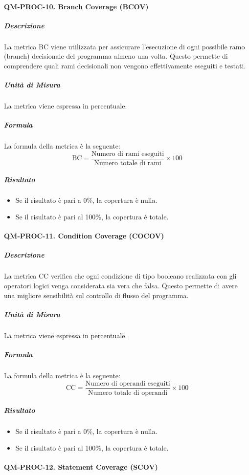 		\paragraph{QM-PROC-10. Branch Coverage (BCOV)}

			\subparagraph{Descrizione}
			La metrica BC viene utilizzata per assicurare l'esecuzione di ogni possibile ramo (branch) decisionale del programma almeno una volta. Questo permette di comprendere quali rami decisionali non vengono effettivamente eseguiti e testati.

			\subparagraph{Unità di Misura}
			La metrica viene espressa in percentuale.

			\subparagraph{Formula}
			La formula della metrica è la seguente:
			\[
				\text{BC} = \frac{\text{Numero di rami eseguiti}}{\text{Numero totale di rami}} \times 100
			\]

			\subparagraph{Risultato}
			\begin{itemize}
				\item Se il risultato è pari a 0\%, la copertura è nulla.
				\item Se il risultato è pari al 100\%, la copertura è totale.
			\end{itemize}

		\paragraph{QM-PROC-11. Condition Coverage (COCOV)}

			\subparagraph{Descrizione}
			La metrica CC verifica che ogni condizione di tipo booleano realizzata con gli operatori logici venga considerata sia vera che falsa. Questo permette di avere una migliore sensibilità sul controllo di flusso del programma.

			\subparagraph{Unità di Misura}
			La metrica viene espressa in percentuale.

			\subparagraph{Formula}
			La formula della metrica è la seguente:
			\[
				\text{CC} = \frac{\text{Numero di operandi eseguiti}}{\text{Numero totale di operandi}} \times 100
			\]

			\subparagraph{Risultato}
			\begin{itemize}
				\item Se il risultato è pari a 0\%, la copertura è nulla.
				\item Se il risultato è pari al 100\%, la copertura è totale.
			\end{itemize}

		\paragraph{QM-PROC-12. Statement Coverage (SCOV)}

